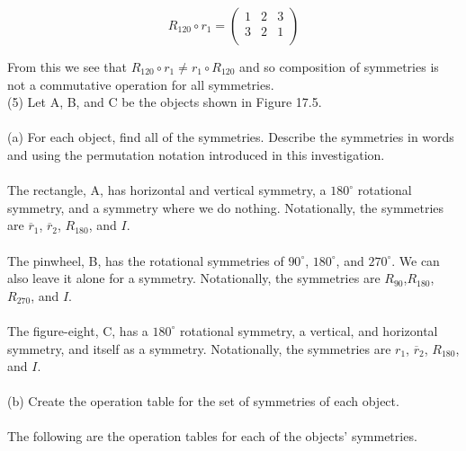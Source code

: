 \documentclass[11pt,a4paper]{article}
\begin{document}
\[
 R_{120}\circ r_1 = \left(\begin{array}{ccc}
1&2&3\\
3&2&1\\
\end{array}\right)
\]

From this we see that $ R_{120}\circ r_1 \neq r_1\circ R_{120}$ and so composition of symmetries is not a commutative operation for all symmetries.\\

(5) Let A, B, and C be the objects shown in Figure 17.5.\\

~\vspace{10mm}\\

(a) For each object, find all of the symmetries. Describe the symmetries in words and using the permutation notation introduced in this investigation.\\
~\\
The rectangle, A, has horizontal and vertical symmetry, a $180^\circ$ rotational symmetry, and a symmetry where we do nothing. Notationally, the symmetries are $\overline{r}_1$, $\overline{r}_2$, $R_{180}$, and $I$.\\
~\\
The pinwheel, B, has the rotational symmetries of $90^\circ$, $180^\circ$, and $270^\circ$. We can also leave it alone for a symmetry. Notationally, the symmetries are $R_{90}$,$R_{180}$, $R_{270}$, and $I$.\\
~\\
The figure-eight, C, has a $180^\circ$ rotational symmetry, a vertical, and horizontal symmetry, and itself as a symmetry. Notationally, the symmetries are $r_1$, $\overline{r}_2$, $R_{180}$, and $I$.\\
~\\
(b) Create the operation table for the set of symmetries of each object.\\
~\\
The following are the operation tables for each of the objects' symmetries.\\
~\\
\end{document}
